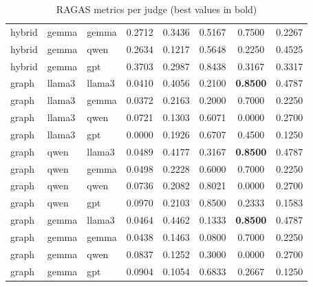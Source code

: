 \begin{table}[ht]
\begin{tabular}{lllccccc}
hybrid & gemma & gemma & 0.2712 & 0.3436 & 0.5167 & 0.7500 & 0.2267 \\
hybrid & gemma & qwen & 0.2634 & 0.1217 & 0.5648 & 0.2250 & 0.4525 \\
hybrid & gemma & gpt & 0.3703 & 0.2987 & 0.8438 & 0.3167 & 0.3317 \\
graph & llama3 & llama3 & 0.0410 & 0.4056 & 0.2100 & \textbf{0.8500} & 0.4787 \\
graph & llama3 & gemma & 0.0372 & 0.2163 & 0.2000 & 0.7000 & 0.2250 \\
graph & llama3 & qwen & 0.0721 & 0.1303 & 0.6071 & 0.0000 & 0.2700 \\
graph & llama3 & gpt & 0.0000 & 0.1926 & 0.6707 & 0.4500 & 0.1250 \\
graph & qwen & llama3 & 0.0489 & 0.4177 & 0.3167 & \textbf{0.8500} & 0.4787 \\
graph & qwen & gemma & 0.0498 & 0.2228 & 0.6000 & 0.7000 & 0.2250 \\
graph & qwen & qwen & 0.0736 & 0.2082 & 0.8021 & 0.0000 & 0.2700 \\
graph & qwen & gpt & 0.0970 & 0.2103 & 0.8500 & 0.2333 & 0.1583 \\
graph & gemma & llama3 & 0.0464 & 0.4462 & 0.1333 & \textbf{0.8500} & 0.4787 \\
graph & gemma & gemma & 0.0438 & 0.1463 & 0.0800 & 0.7000 & 0.2250 \\
graph & gemma & qwen & 0.0837 & 0.1252 & 0.3000 & 0.0000 & 0.2700 \\
graph & gemma & gpt & 0.0904 & 0.1054 & 0.6833 & 0.2667 & 0.1250 \\

\bottomrule
\end{tabular}
\caption{RAGAS metrics per judge (best values in bold)}
\end{table}
